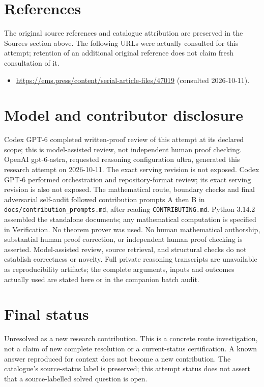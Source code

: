 \documentclass[11pt]{article}
\begin{document}
\section{References}
The original source references and catalogue attribution are preserved in the
Sources section above. The following URLs were actually consulted for this attempt;
retention of an additional original reference does not claim fresh consultation of it.
\begin{itemize}
\item \url{https://ems.press/content/serial-article-files/47019} (consulted 2026-10-11). 
\end{itemize}
\section{Model and contributor disclosure}
Codex GPT-6 completed written-proof review of this attempt at its declared scope; this is model-assisted review, not independent human proof checking.
OpenAI gpt-6-astra, requested reasoning configuration ultra, generated this research
attempt on 2026-10-11. The exact serving revision is not exposed. Codex GPT-6
performed orchestration and repository-format review; its exact serving revision
is also not exposed. The mathematical route, boundary checks and final adversarial
self-audit followed contribution prompts A then B in
\texttt{docs/contribution\_prompts.md}, after reading \texttt{CONTRIBUTING.md}.
Python 3.14.2 assembled the standalone documents; any mathematical computation is
specified in Verification. No theorem prover was used. No human mathematical
authorship, substantial human proof correction, or independent human proof checking
is asserted. Model-assisted review, source retrieval, and structural checks do not
establish correctness or novelty. Full private reasoning transcripts are unavailable
as reproducibility artifacts; the complete arguments, inputs and outcomes actually
used are stated here or in the companion batch audit.
\section{Final status}
Unresolved as a new research contribution. This is a concrete route investigation,
not a claim of new complete resolution or a current-status certification. A known
answer reproduced for context does not become a new contribution. The catalogue's
source-status label is preserved; this attempt status does not assert that a
source-labelled solved question is open.
\end{document}
